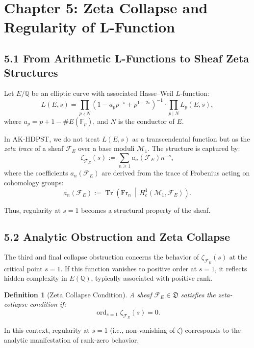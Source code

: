 \documentclass[11pt]{article}
\newtheorem{definition}[theorem]{Definition}
\DeclareMathOperator{\Tr}{Tr}
\newcommand{\ord}{\operatorname{ord}}
\begin{document}
\section{Chapter 5: Zeta Collapse and Regularity of L-Function}
\label{sec:zeta-collapse}

\subsection*{5.1 From Arithmetic L-Functions to Sheaf Zeta Structures}

Let \( E/\mathbb{Q} \) be an elliptic curve with associated Hasse–Weil \( L \)-function:
\[
L(E, s) = \prod_{p \nmid N} (1 - a_p p^{-s} + p^{1 - 2s})^{-1} \cdot \prod_{p \mid N} L_p(E, s),
\]
where \( a_p = p + 1 - \#E(\mathbb{F}_p) \), and \( N \) is the conductor of \( E \).

In AK-HDPST, we do not treat \( L(E,s) \) as a transcendental function but as the \emph{zeta trace} of a sheaf \( \mathcal{F}_E \) over a base moduli \( \mathcal{M}_1 \). The structure is captured by:
\[
\zeta_{\mathcal{F}_E}(s) := \sum_{n \geq 1} a_n(\mathcal{F}_E) n^{-s},
\]
where the coefficients \( a_n(\mathcal{F}_E) \) are derived from the trace of Frobenius acting on cohomology groups:
\[
a_n(\mathcal{F}_E) := \Tr\left( \mathrm{Fr}_n \,\middle|\, H^1_c(\mathcal{M}_1, \mathcal{F}_E) \right).
\]

Thus, regularity at \( s = 1 \) becomes a structural property of the sheaf.

\subsection*{5.2 Analytic Obstruction and Zeta Collapse}

The third and final collapse obstruction concerns the behavior of \( \zeta_{\mathcal{F}_E}(s) \) at the critical point \( s = 1 \). If this function vanishes to positive order at \( s = 1 \), it reflects hidden complexity in \( E(\mathbb{Q}) \), typically associated with positive rank.

\begin{definition}[Zeta Collapse Condition]
\label{def:zeta-collapse}
A sheaf \( \mathcal{F}_E \in \mathfrak{D} \) satisfies the zeta-collapse condition if:
\[
\ord_{s=1} \zeta_{\mathcal{F}_E}(s) = 0.
\]
\end{definition}

In this context, regularity at \( s=1 \) (i.e., non-vanishing of \( \zeta \)) corresponds to the analytic manifestation of rank-zero behavior.
\end{document}
